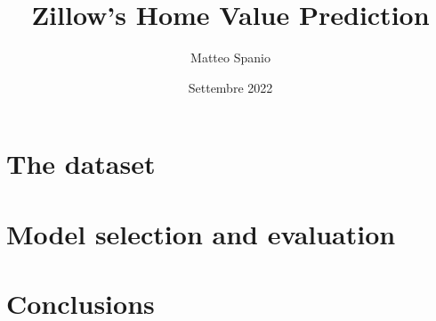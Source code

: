 \documentclass[12pt, twoside]{article}
\title{Zillow’s Home Value Prediction}
\author{Matteo Spanio}
\date{Settembre 2022}
\begin{document}
  


  \section{The dataset}
     
  

  \section{Model selection and evaluation}

  

  \section{Conclusions}\label{conclusions}
    
  
\end{document}
